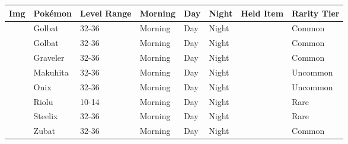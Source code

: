 \begin{longtable}{||l l l l l l l l||}%
\hline%
Img&Pokémon&Level Range&Morning&Day&Night&Held Item&Rarity Tier\\%
\hline%
\endhead%
\hline%
&Golbat&32{-}36&Morning&Day&Night&&Common\\%
\hline%
&Golbat&32{-}36&Morning&Day&Night&&Common\\%
\hline%
&Graveler&32{-}36&Morning&Day&Night&&Common\\%
\hline%
&Makuhita&32{-}36&Morning&Day&Night&&Uncommon\\%
\hline%
&Onix&32{-}36&Morning&Day&Night&&Uncommon\\%
\hline%
&Riolu&10{-}14&Morning&Day&Night&&Rare\\%
\hline%
&Steelix&32{-}36&Morning&Day&Night&&Rare\\%
\hline%
&Zubat&32{-}36&Morning&Day&Night&&Common\\%
\hline%
\end{longtable}
